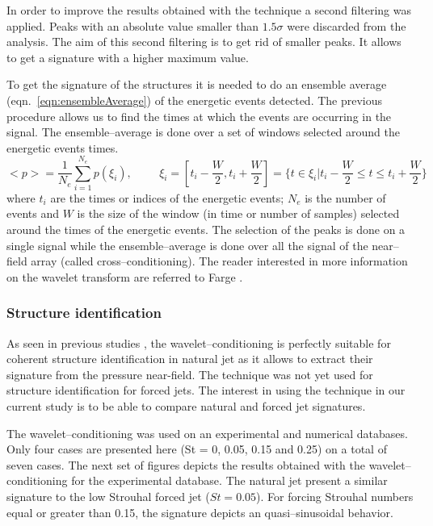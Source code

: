 \documentclass[english]{aiaa-tc}
\begin{document}
In order to improve the results obtained with the technique a second filtering was applied. 
Peaks with an absolute value smaller than $1.5\sigma$ were discarded from the analysis. 
The aim of this second filtering is to get rid of smaller peaks. It allows to get a signature with a higher maximum value.

To get the signature of the structures it is needed to do an ensemble average (eqn.~\ref{eqn:ensembleAverage}) of the energetic events detected. 
The previous procedure allows us to find the times at which the events are occurring in the signal. The ensemble--average is done over a set of windows selected around the energetic events times.
\begin{equation} \label{eqn:ensembleAverage}
<p> = \frac{1}{N_{e}} \sum_{i=1}^{N_{e}} p\left(\xi_{i} \right), \hspace{1cm} \xi_{i} = \left[ t_{i}-\frac{W}{2}, t_{i}+\frac{W}{2}\right] = \{ t \in \xi_{i} | t_{i}-\frac{W}{2} \leq t \leq t_{i}+\frac{W}{2}\}
\end{equation}
where $t_{i}$ are the times or indices of the energetic events; $N_{e}$ is the number of events and $W$ is the size of the window (in time or number of samples) selected around the times of the energetic events.
The selection of the peaks is done on a single signal while the ensemble--average is done over all the signal of the near--field array (called cross--conditioning).
The reader interested in more information on the wavelet transform are referred to Farge \cite{Farge1992}.

\subsubsection{Structure identification}
As seen in previous studies \cite{Camussi1997,Camussi1997b,Camussi2002}, the wavelet--conditioning is perfectly suitable for coherent structure identification in natural jet as it allows to extract their signature from the pressure near-field. 
The technique was not yet used for structure identification for forced jets. 
The interest in using the technique in our current study is to be able to compare natural and forced jet signatures.

The wavelet--conditioning was used on an experimental and numerical databases. 
Only four cases are presented here (St = 0, 0.05, 0.15 and 0.25) on a total of seven cases. 
The next set of figures depicts the results obtained with the wavelet--conditioning for the experimental database. 
The natural jet present a similar signature to the low Strouhal forced jet ($St = 0.05$). 
For forcing Strouhal numbers equal or greater than 0.15, the signature depicts an quasi--sinusoidal behavior.
\end{document}
